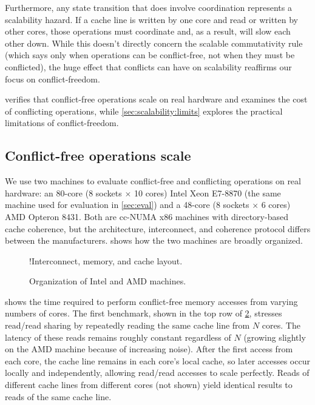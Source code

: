 Furthermore, any state transition that does involve coordination
represents a scalability hazard.  If a cache line is written by one
core and read or written by other cores, those operations must
coordinate and, as a result, will slow each other down.  While this
doesn't directly concern the scalable commutativity rule (which says
only when operations can be conflict-free, not when they must be
conflicted), the huge effect that conflicts can have on scalability
reaffirms our focus on conflict-freedom.

 verifies that conflict-free
operations scale on real hardware and examines the cost of conflicting
operations, while \cref{sec:scalability:limits} explores the practical
limitations of conflict-freedom.


\subsection{Conflict-free operations scale}
\label{sec:scalability:conflict-free}

We use two machines to evaluate conflict-free and conflicting
operations on real
hardware: an 80-core (8 sockets $\times$ 10 cores) Intel Xeon E7-8870
(the same machine used for evaluation in \cref{sec:eval}) and a
48-core (8 sockets $\times$ 6 cores) AMD Opteron 8431.  Both are
cc-NUMA x86 machines with directory-based cache coherence, but the
architecture, interconnect, and coherence protocol
differs between the manufacturers.   shows how the
two machines are broadly organized.

\begin{figure}
  \centering
  \XXX!{Interconnect, memory, and cache layout.}
  \caption{Organization of Intel and AMD machines.}
  \label{fig:machines}
\end{figure}


\begin{figure}
  \centering
  
  \label{fig:cfree-cycles}
\end{figure}

 shows the time required to perform
conflict-free memory accesses from varying numbers of cores.  The
first benchmark, shown in the top row of \cref{fig:cfree-cycles},
stresses read/read sharing by repeatedly reading the same cache line
from $N$ cores.  The latency of these reads remains roughly constant
regardless of $N$ (growing slightly on the AMD machine because of
increasing noise).  After the first access from each core, the cache
line remains in each core's local cache, so later accesses occur
locally and independently, allowing read/read accesses to scale
perfectly.  Reads of different cache lines from different cores (not
shown) yield identical results to reads of the same cache line.

